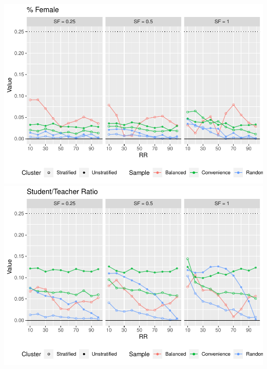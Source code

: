 \documentclass[
  man,floatsintext]{apa6}
\begin{document}
\includegraphics{5---Analysis_files/figure-latex/unnamed-chunk-19-1.pdf} \includegraphics{5---Analysis_files/figure-latex/unnamed-chunk-19-2.pdf}
\end{document}
